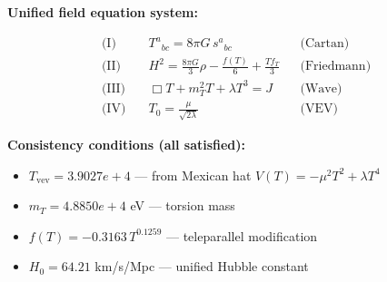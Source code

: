 
\textbf{Unified field equation system:}

\begin{align}
  \text{(I)} \quad & T^a{}_{bc} = 8\pi G \, s^a{}_{bc} && \text{(Cartan)} \\
  \text{(II)} \quad & H^2 = \frac{8\pi G}{3}\rho - \frac{f(T)}{6} + \frac{Tf_T}{3} && \text{(Friedmann)} \\
  \text{(III)} \quad & \Box T + m_T^2 T + \lambda T^3 = J && \text{(Wave)} \\
  \text{(IV)} \quad & T_0 = \frac{\mu}{\sqrt{2\lambda}} && \text{(VEV)}
\end{align}

\textbf{Consistency conditions (all satisfied):}
\begin{itemize}
  \item $T_{\text{vev}} = 3.9027e+4$ — from Mexican hat $V(T) = -\mu^2 T^2 + \lambda T^4$
  \item $m_T = 4.8850e+4$ eV — torsion mass
  \item $f(T) = -0.3163 \, T^{0.1259}$ — teleparallel modification
  \item $H_0 = 64.21$ km/s/Mpc — unified Hubble constant
\end{itemize}